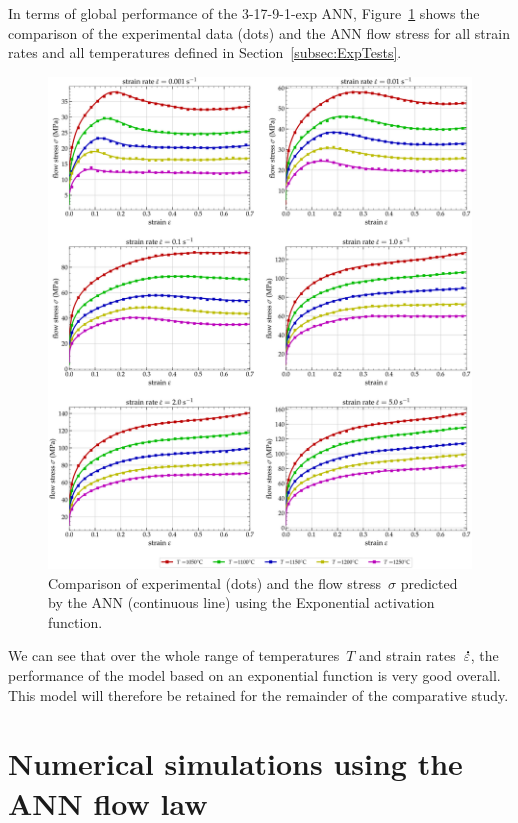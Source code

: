 \documentclass[algorithms,article,submit,pdftex,oneauthors]{Definitions/mdpi}
\DeclareRobustCommand{\mdot}[1]{\accentset{\mbox{\bfseries .}}{#1}}
\begin{document}
In terms of global performance of the 3-17-9-1-exp ANN, Figure~\ref{fig:ANN-ExpFit} shows the comparison of the experimental data (dots) and the ANN flow stress for all strain rates and all temperatures defined in Section~\ref{subsec:ExpTests}.
\begin{figure}[h!]
\centering
\includegraphics[width=0.95\columnwidth]{Figures/3Cr2Mo-3-17-9-1-exponential}
\caption{Comparison of experimental (dots) and the flow stress~$\sigma$ predicted by the ANN (continuous line) using the Exponential activation function.}
\label{fig:ANN-ExpFit}
\end{figure}
We can see that over the whole range of temperatures~$T$ and strain rates~$\mdot{\varepsilon}$, the performance of the model based on an exponential function is very good overall.
This model will therefore be retained for the remainder of the comparative study.

\section{Numerical simulations using the ANN flow law}\label{sec:Numerical}
\end{document}
